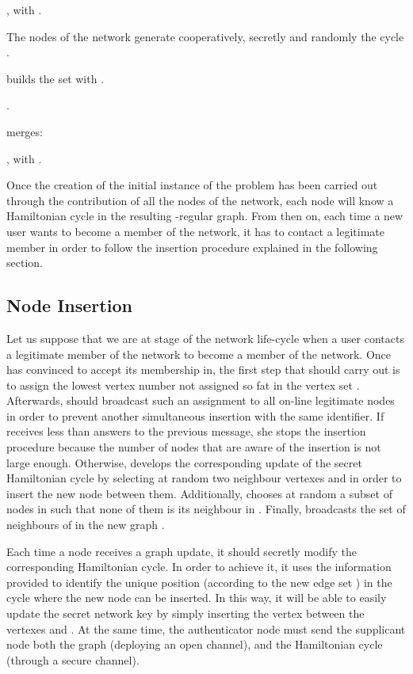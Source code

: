 \documentclass[conference]{IEEEtran}
\begin{document}
\begin{description}
\item [Input:] , with .


\item [1.]The   nodes of the network generate cooperatively, secretly and randomly the cycle .

\item [2.]  builds the set  with .

\item [3.] .

\item [4.]  merges: 


 \item [Output: ] , with .
\end{description}

Once the creation of the initial instance of the problem has
been carried out through the contribution of all the nodes
of the network, each node will know a Hamiltonian
cycle in the resulting -regular graph. From then on,
each time a new user  wants to become a member of the network,
it has to contact a legitimate member  in order to follow the
insertion procedure explained in the following section.

\subsection{Node Insertion}


Let us suppose that we are at  stage  of the network life-cycle
when a user  contacts a legitimate member  of the network to
become a member of the network. Once  has convinced  to
accept its membership in, the first step that  should
carry out is to assign  the lowest vertex number  not assigned
so fat in the vertex set . Afterwards,  should
broadcast such an assignment to all on-line legitimate nodes in order to prevent another simultaneous insertion with the same identifier. If  receives
less than  answers to the previous message, she stops the insertion procedure because
the number of nodes that are aware of the insertion is not large
enough. Otherwise,  develops the corresponding update of the
secret Hamiltonian cycle  by selecting at random two
neighbour vertexes  and  in order to insert the new node
 between them. Additionally,  chooses at random a subset of 
nodes in  such that none of them is its neighbour in . Finally,  broadcasts the set of neighbours  of  in
the new graph  .

Each time a node receives a graph update, it should secretly modify the corresponding Hamiltonian cycle. In order to achieve it, it uses the information provided to identify the unique position (according to the new edge set ) in the cycle where the new node can be inserted. In this way, it will be able to easily update the secret network key by simply inserting the vertex  between the vertexes  and . At the same time, the
authenticator node  must send the supplicant node  both the graph  (deploying an open channel), and  the Hamiltonian cycle  (through a secure channel).
\end{document}
